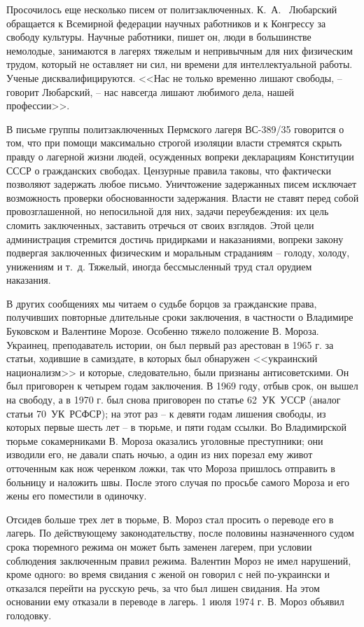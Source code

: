 \documentclass{book}
\begin{document}
Просочилось еще несколько писем от политзаключенных. К.~А.~	Любарский обращается к Всемирной федерации научных работников и к Конгрессу за свободу культуры. Научные работники, пишет он, люди в большинстве немолодые, занимаются в лагерях тяжелым и непривычным для них физическим трудом, который не оставляет ни сил, ни времени для интеллектуальной работы. Ученые дисквалифицируются. <<Нас не только временно лишают свободы, -- говорит Любарский, -- нас навсегда лишают любимого дела, нашей профессии>>.

В письме группы политзаключенных Пермского лагеря ВС-389/35 говорится о том, что при помощи максимально строгой изоляции власти стремятся скрыть правду о лагерной жизни людей, осужденных вопреки декларациям Конституции СССР о гражданских свободах. Цензурные правила таковы, что фактически позволяют задержать любое письмо. Уничтожение задержанных писем исключает возможность проверки обоснованности задержания. Власти не ставят перед собой провозглашенной, но непосильной для них, задачи переубеждения: их цель   сломить заключенных, заставить отречься от своих взглядов. Этой цели администрация стремится достичь придирками и наказаниями, вопреки закону подвергая заключенных физическим и моральным страданиям -- голоду, холоду, унижениям и т.~д. Тяжелый, иногда бессмысленный труд стал орудием наказания.

В других сообщениях мы читаем о судьбе борцов за гражданские права, получивших повторные длительные сроки заключения, в частности о Владимире Буковском и Валентине Морозе. Особенно тяжело положение В. Мороза. Украинец, преподаватель истории, он был первый раз арестован в 1965 г. за статьи, ходившие в самиздате, в которых был обнаружен <<украинский национализм>> и которые, следовательно, были признаны антисоветскими. Он был приговорен к четырем годам заключения. В 1969 году, отбыв срок, он вышел на свободу, а в 1970 г. был снова приговорен по статье 62~УК~УССР (аналог статьи 70~УК~РСФСР); на этот раз -- к девяти годам лишения свободы, из которых первые шесть лет -- в тюрьме, и пяти годам ссылки. Во Владимирской тюрьме сокамерниками В. Мо­роза оказались уголовные преступники; они изводили его, не давали спать ночью, а один из них порезал ему живот отточенным как нож черенком ложки, так что Мороза пришлось отпра­вить в больницу и наложить швы. После этого случая по просьбе самого Мороза и его жены его поместили в 
одиночку.

Отсидев больше трех лет в тюрьме, В. Мороз стал просить о переводе его в лагерь. По действующему законодательству, после половины назначенного судом срока тюремного режима он может быть заменен лагерем, при условии соблюдения заключенным правил режима. Валентин Мороз не имел нарушений, кроме одного: во время свидания с женой он говорил с ней по-украински и отказался перейти на русскую речь, за что был лишен свидания. На этом основании ему отказали в переводе в лагерь. 1 июля 1974 г. В. Мороз объявил голодовку.
\end{document}
